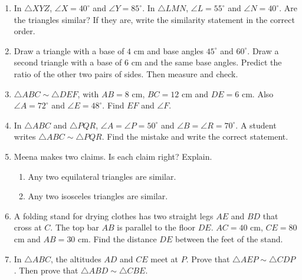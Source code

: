 \documentclass[11pt,a4paper]{article}
\theoremstyle{brand}
\theoremstyle{branddef}
\newcommand{\tr}{\triangle}
\newenvironment{exercise}[1]
  {\par\medskip\Needspace{7\baselineskip}\noindent{\large\bfseries\color{accent}Exercise #1}
   \par\smallskip
   \begin{enumerate}[leftmargin=*,itemsep=4pt]}
  {\end{enumerate}}
\newcommand{\slab}[4][0.5]{\path (#2) -- (#3) node[pos=#1, auto=right, inner sep=2.5pt] {#4};}
\begin{document}
\begin{exercise}{2D}
  \item In $\tr XYZ$, $\angle X=40^\circ$ and $\angle Y=85^\circ$. In $\tr LMN$, $\angle L=55^\circ$ and $\angle N=40^\circ$. Are the triangles similar? If they are, write the similarity statement in the correct order.
  \item Draw a triangle with a base of $4$ cm and base angles $45^\circ$ and $60^\circ$. Draw a second triangle with a base of $6$ cm and the same base angles. Predict the ratio of the other two pairs of sides. Then measure and check.
  \item $\tr ABC\sim\tr DEF$, with $AB=8$ cm, $BC=12$ cm and $DE=6$ cm. Also $\angle A=72^\circ$ and $\angle E=48^\circ$. Find $EF$ and $\angle F$.
  \item In $\tr ABC$ and $\tr PQR$, $\angle A=\angle P=50^\circ$ and $\angle B=\angle R=70^\circ$. A student writes $\tr ABC\sim\tr PQR$. Find the mistake and write the correct statement.
  \item Meena makes two claims. Is each claim right? Explain.
  \begin{enumerate}[label=(\alph*),itemsep=1pt]
    \item Any two equilateral triangles are similar.
    \item Any two isosceles triangles are similar.
  \end{enumerate}
  \item A folding stand for drying clothes has two straight legs $AE$ and $BD$ that cross at $C$. The top bar $AB$ is parallel to the floor $DE$. $AC=40$ cm, $CE=80$ cm and $AB=30$ cm. Find the distance $DE$ between the feet of the stand.
\begin{center}\end{center}
  \item In $\tr ABC$, the altitudes $AD$ and $CE$ meet at $P$. Prove that $\tr AEP\sim\tr CDP$. Then prove that $\tr ABD\sim\tr CBE$.

\end{exercise}
\end{document}

